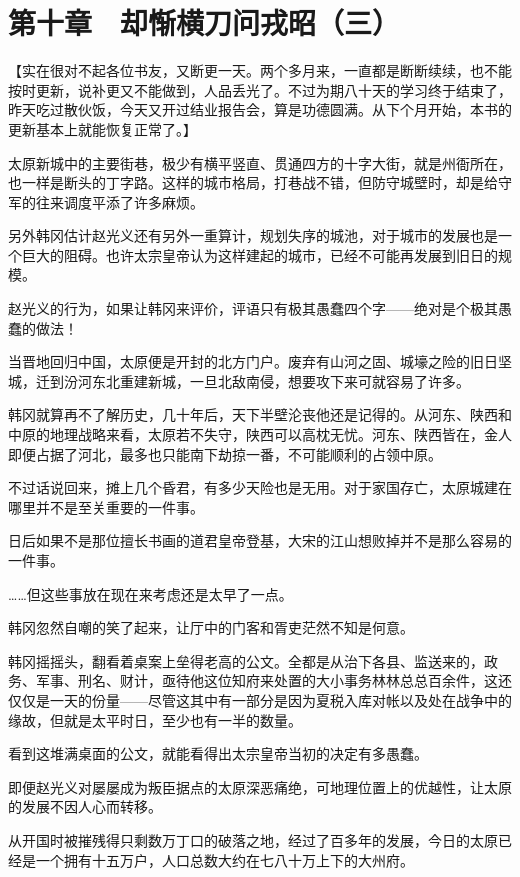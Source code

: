 \section{第十章　却惭横刀问戎昭（三）}

【实在很对不起各位书友，又断更一天。两个多月来，一直都是断断续续，也不能按时更新，说补更又不能做到，人品丢光了。不过为期八十天的学习终于结束了，昨天吃过散伙饭，今天又开过结业报告会，算是功德圆满。从下个月开始，本书的更新基本上就能恢复正常了。】

太原新城中的主要街巷，极少有横平竖直、贯通四方的十字大街，就是州衙所在，也一样是断头的丁字路。这样的城市格局，打巷战不错，但防守城壁时，却是给守军的往来调度平添了许多麻烦。

另外韩冈估计赵光义还有另外一重算计，规划失序的城池，对于城市的发展也是一个巨大的阻碍。也许太宗皇帝认为这样建起的城市，已经不可能再发展到旧日的规模。

赵光义的行为，如果让韩冈来评价，评语只有极其愚蠢四个字——绝对是个极其愚蠢的做法！

当晋地回归中国，太原便是开封的北方门户。废弃有山河之固、城壕之险的旧日坚城，迁到汾河东北重建新城，一旦北敌南侵，想要攻下来可就容易了许多。

韩冈就算再不了解历史，几十年后，天下半壁沦丧他还是记得的。从河东、陕西和中原的地理战略来看，太原若不失守，陕西可以高枕无忧。河东、陕西皆在，金人即便占据了河北，最多也只能南下劫掠一番，不可能顺利的占领中原。

不过话说回来，摊上几个昏君，有多少天险也是无用。对于家国存亡，太原城建在哪里并不是至关重要的一件事。

日后如果不是那位擅长书画的道君皇帝登基，大宋的江山想败掉并不是那么容易的一件事。

……但这些事放在现在来考虑还是太早了一点。

韩冈忽然自嘲的笑了起来，让厅中的门客和胥吏茫然不知是何意。

韩冈摇摇头，翻看着桌案上垒得老高的公文。全都是从治下各县、监送来的，政务、军事、刑名、财计，亟待他这位知府来处置的大小事务林林总总百余件，这还仅仅是一天的份量——尽管这其中有一部分是因为夏税入库对帐以及处在战争中的缘故，但就是太平时日，至少也有一半的数量。

看到这堆满桌面的公文，就能看得出太宗皇帝当初的决定有多愚蠢。

即便赵光义对屡屡成为叛臣据点的太原深恶痛绝，可地理位置上的优越性，让太原的发展不因人心而转移。

从开国时被摧残得只剩数万丁口的破落之地，经过了百多年的发展，今日的太原已经是一个拥有十五万户，人口总数大约在七八十万上下的大州府。

